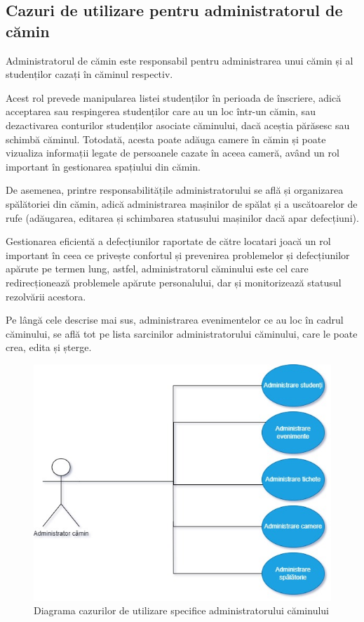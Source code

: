 \documentclass[12pt,a4paper]{report}
\theoremstyle{definition}
\theoremstyle{remark}
\begin{document}
\subsection{Cazuri de utilizare pentru administratorul de cămin}
\par Administratorul de cămin este responsabil pentru administrarea unui cămin și al studenților cazați în căminul respectiv.

\par Acest rol prevede manipularea listei studenților în perioada de înscriere, adică acceptarea sau respingerea studenților care au un loc într-un cămin, sau dezactivarea conturilor studenților asociate căminului, dacă aceștia părăsesc sau schimbă căminul. Totodată, acesta poate adăuga camere în cămin și poate vizualiza informații legate de persoanele cazate în aceea cameră, având un rol important în gestionarea spațiului din cămin.
\par De asemenea, printre responsabilitățile administratorului se află și organizarea spălătoriei din cămin, adică administrarea mașinilor de spălat și a uscătoarelor de rufe (adăugarea, editarea și schimbarea statusului mașinilor dacă apar defecțiuni). 
\par Gestionarea eficientă a defecțiunilor raportate de către locatari joacă un rol important în ceea ce privește confortul și prevenirea problemelor și defecțiunilor apărute pe termen lung, astfel, administratorul căminului este cel care redirecționează problemele apărute personalului, dar și monitorizează statusul rezolvării acestora.
\par Pe lângă cele descrise mai sus, administrarea evenimentelor ce au loc în cadrul căminului, se află tot pe lista sarcinilor administratorului căminului, care le poate crea, edita și șterge.

\begin{figure}[H]
    \centering
    \includegraphics[width=0.6\linewidth, height=0.3\textheight]{resurse/diagrame/UVTDorms_USECASE_ADMINISTRATOR_CAMIN.jpg}
    \caption{Diagrama cazurilor de utilizare specifice administratorului căminului}
\end{figure}
\end{document}

